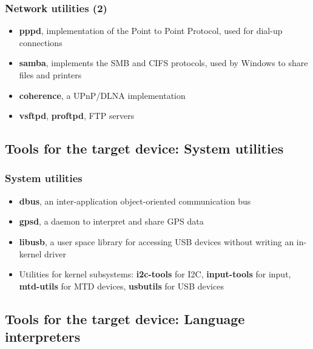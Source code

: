 \begin{frame}
  \frametitle{Network utilities (2)}
  \begin{itemize}
  \item {\bf pppd}, implementation of the Point to Point Protocol,
    used for dial-up connections
  \item {\bf samba}, implements the SMB and CIFS protocols, used by
    Windows to share files and printers
  \item {\bf coherence}, a UPnP/DLNA implementation
  \item {\bf vsftpd}, {\bf proftpd}, FTP servers
  \end{itemize}
\end{frame}

\subsection[System utilities]{Tools for the target device: System
  utilities}

\begin{frame}
  \frametitle{System utilities}
  \begin{itemize}
  \item {\bf dbus}, an inter-application object-oriented communication bus
  \item {\bf gpsd}, a daemon to interpret and share GPS data
  \item {\bf libusb}, a user space library for accessing USB devices
    without writing an in-kernel driver
  \item Utilities for kernel subsystems: {\bf i2c-tools} for I2C, {\bf
      input-tools} for input, {\bf mtd-utils} for MTD devices, {\bf
      usbutils} for USB devices
  \end{itemize}
\end{frame}

\subsection[Language Interpreters]{Tools for the target device:
  Language interpreters}

